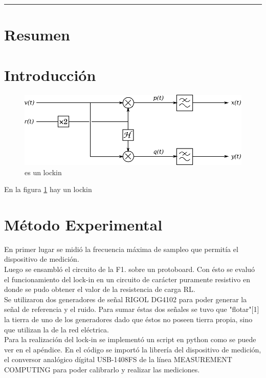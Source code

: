 \documentclass[11pt,a4paper]{extarticle}
\begin{document}
\hrule
\begin{multicols}{2}
\normalsize
\section{Resumen}

\section{Introducción}

\begin{figure}[H]
	\centering
	\includegraphics[width=\linewidth]{Images/lockin.eps}
	\caption{es un lockin}
	\label{fig:lockin}
\end{figure}


En la figura \ref{fig:lockin} hay un lockin

\section{Método Experimental}
En primer lugar se midió la frecuencia máxima de 
sampleo que permitía el dispositivo de medición.\\

Luego se ensambló el circuito de la F1. sobre 
un protoboard. Con ésto se evaluó el funcionamiento del
lock-in en un circuito de carácter puramente resistivo 
en donde se pudo obtener el valor de la resistencia 
de carga RL.\\ 

Se utilizaron dos generadores de señal RIGOL DG4102 
para poder generar la señal de referencia y el ruido.
Para sumar éstas dos señales se tuvo que "flotar"[1] la 
tierra de uno de los generadores dado que éstos no poseen 
tierra propia, sino que utilizan la de la red eléctrica.\\

Para la realización del lock-in se implementó un 
script en python como se puede ver en el apéndice.
En el código se importó la librería del dispositivo 
de medición, el 
conversor analógico dígital USB-1408FS de la línea 
MEASUREMENT COMPUTING para poder 
calibrarlo y realizar las mediciones.\\


\end{multicols}
\end{document}
